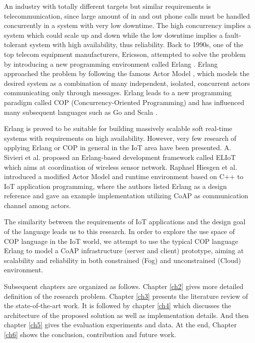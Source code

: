 An industry with totally different targets but similar requirements is telecommunication, since large amount of in and out phone calls must be handled concurrently in a system with very low downtime. The high concurrency implies a system which could scale up and down while the low downtime implies a fault-tolerant system with high availability, thus reliability. Back to 1990s, one of the top telecom equipment manufacturers, Ericsson, attempted to solve the problem by introducing a new programming environment called Erlang \cite{erl}. Erlang approached the problem by following the famous Actor Model \cite{agha1986actors}, which models the desired system as a combination of many independent, isolated, concurrent actors communicating only through messages. Erlang leads to a new programming paradigm called COP (Concurrency-Oriented Programming) \cite{armstrong2003concurrency} and has influenced many subsequent languages such as Go \cite{go} and Scala \cite{scala}.  

Erlang is proved to be suitable for building massively scalable soft real-time systems with requirements on high availability. However, very few research of applying Erlang or COP in general in the IoT area have been presented. A. Sivieri et al. \cite{Sivieri:2012:DPT:2667049.2667051} proposed an Erlang-based development framework called ELIoT which aims at coordination of wireless sensor network. Raphael Hiesgen et al. \cite{7034296} introduced a modified Actor Model and runtime environment based on C++ to IoT application programming, where the authors listed Erlang as a design reference and gave an example implementation utilizing CoAP as communication channel among actors.  

The similarity between the requirements of IoT applications and the design goal of the language leads us to this research. In order to explore the use space of COP language in the IoT world, we attempt to use the typical COP language Erlang to model a CoAP infrastructure (server and client) prototype, aiming at scalability and reliability in both constrained (Fog) and unconstrained (Cloud) environment.

Subsequent chapters are organized as follows. Chapter \ref{ch2} gives more detailed definition of the research problem. Chapter \ref{ch3} presents the literature review of the state-of-the-art work. It is followed by chapter \ref{ch4} which discusses the architecture of the proposed solution as well as implementation details. And then chapter \ref{ch5} gives the evaluation experiments and data. At the end, Chapter \ref{ch6} shows the conclusion, contribution and future work.